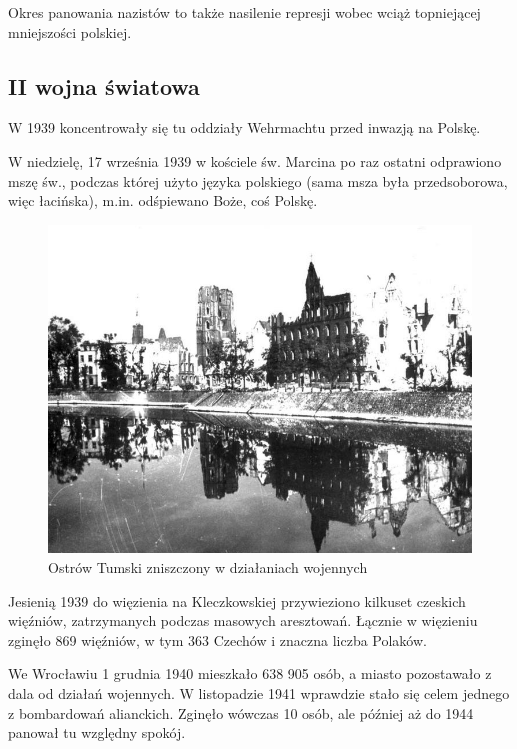 \documentclass{article}
\begin{document}
Okres panowania nazistów to także nasilenie represji wobec wciąż topniejącej mniejszości polskiej.
\subsection{II wojna światowa}
W 1939 koncentrowały się tu oddziały Wehrmachtu przed inwazją na Polskę.

W niedzielę, 17 września 1939 w kościele św. Marcina po raz ostatni odprawiono mszę św., podczas której użyto języka polskiego (sama msza była przedsoborowa, więc łacińska), m.in. odśpiewano Boże, coś Polskę.
\begin{figure}[h!]
\centering
\begin{adjustwidth}{-.2in}{-.5in}  
\includegraphics[scale=0.5]{Obrazy/Wrocław ostrów.png}
\end{adjustwidth}
\caption{Ostrów Tumski zniszczony w działaniach wojennych}
\label{fig:ostrow}
\end{figure}

Jesienią 1939 do więzienia na Kleczkowskiej przywieziono kilkuset czeskich więźniów, zatrzymanych podczas masowych aresztowań. Łącznie w więzieniu zginęło 869 więźniów, w tym 363 Czechów i znaczna liczba Polaków.

We Wrocławiu 1 grudnia 1940 mieszkało 638 905 osób, a miasto pozostawało z dala od działań wojennych. W listopadzie 1941 wprawdzie stało się celem jednego z bombardowań alianckich. Zginęło wówczas 10 osób, ale później aż do 1944 panował tu względny spokój.
\end{document}
